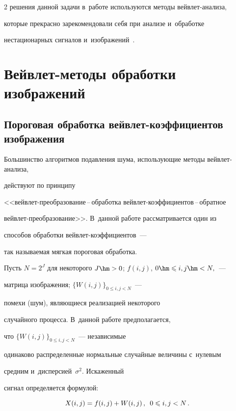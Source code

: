 \begin{multicols}{2}
решения данной задачи в~работе используются методы вейв\-лет-анализа,

которые прекрасно зарекомендовали себя при анализе и~обработке

нестационарных сигналов и~изображений~\cite{smolentsev, posobie}.





\section{Вейвлет-методы обработки изображений}



\subsection{Пороговая обработка вейвлет-коэффициентов изображения}



Большинство алгоритмов подавления шума, использующие методы вейв\-лет-ана\-ли\-за, 

действуют по принципу 

<<вейв\-лет-пре\-об\-ра\-зо\-ва\-ние\,--\,обработка вейв\-лет-ко\-эф\-фи\-ци\-ен\-тов\,--\,об\-рат\-ное 

вейв\-лет-пре\-об\-ра\-зо\-ва\-ние>>. В~данной работе рассматривается один из 

способов обработки вейв\-лет-ко\-эф\-фи\-ци\-ен\-тов~--- 

так называемая мягкая пороговая обработка.



Пусть $N=2^J$ для некоторого $J\hm>0$; $f(i,j)$, $0\hm\leqslant i,j \hm< N,$~--- 

матрица изображения; $\{W(i,j)\}_{0\leqslant i,j < N}$~--- 

помехи (шум), являющиеся реализацией некоторого

случайного процесса. В~данной работе предполагается, 

что $\{W(i,j)\}_{0\leqslant i,j < N}$~--- независимые

одинаково распределенные нормальные случайные величины с~нулевым 

средним и~дисперсией~$\sigma^2$. Искаженный

сигнал определяется формулой:

\begin{equation*}

    X(i,j)=f(i,j)+W(i,j)\,, \enskip 0 \leqslant i,j < N\,.


\end{equation*}
\end{multicols}
